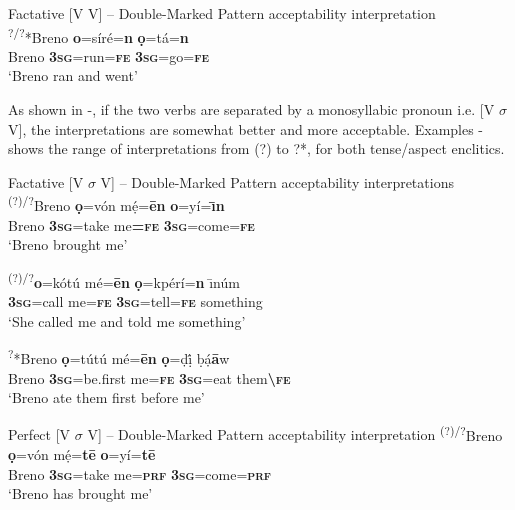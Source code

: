 \documentclass[output=paper]{langsci/langscibook}
\begin{document}
\ea\label{ex:rolle:23}
{Factative [V V] – Double-Marked Pattern acceptability interpretation}\\
\gll  \textsuperscript{?/?}*Breno   \textbf{o}=síré=\textbf{n}     \textbf{ọ}=tá=\textbf{n}\\
     Breno  \textbf{\textsc{3sg}}=run=\textbf{\textsc{fe}}    \textbf{\textsc{3sg}}=go=\textbf{\textsc{fe}}\\
\glt ‘Breno ran and went’
\z

As shown in -, if the two verbs are separated by a monosyllabic pronoun i.e. [V $\sigma $ V], the interpretations are somewhat better and more acceptable. Examples - shows the range of interpretations from (?) to ?*, for both tense/aspect enclitics.



\ea\label{ex:rolle:24}
{Factative [V $\sigma $ V] – Double-Marked Pattern acceptability interpretations} \\
  \ea 
\gll   \textsuperscript{(?)/?}Breno  \textbf{ọ}=vón  m\'{ẹ}=\textbf{\=en}  \textbf{o}=yí=\textbf{\={\i}n}\\
         Breno  \textbf{\textsc{3}\textsc{sg}}=take  me\textbf{=}\textbf{\textsc{fe}} \textbf{\textsc{3sg}}=come=\textbf{\textsc{fe}}\\
\glt ‘Breno brought me’

\ex\label{ex:rolle:25}
\gll   \textsuperscript{(?)/?}\textbf{o}=kótú    mé=\textbf{\=en}   \textbf{ọ}=kpérí=\textbf{n}   \={\i}núm\\
         \textbf{\textsc{3sg}}=call    me=\textbf{\textsc{fe}} \textbf{\textsc{3sg}}=tell=\textbf{\textsc{fe}}  something\\
\glt ‘She called me and told me something’

\ex\label{ex:rolle:26}
\gll   \textsuperscript{?}*Breno   \textbf{ọ}=tútú     mé=\textbf{ēn}  \textbf{ọ}=ḍị́   ḅạ́\textbf{ā}w\\
         Breno  \textbf{\textsc{3sg}}=be.first  me=\textbf{\textsc{fe}}   \textbf{\textsc{3sg}}=eat  them\textbf{{\textbackslash}}\textbf{\textsc{fe}}\\
\glt ‘Breno ate them first before me’
\z
\z 

\ea\label{ex:rolle:27}
{Perfect [V $\sigma $ V] – Double-Marked Pattern acceptability interpretation}
\gll  \textsuperscript{(?)/?}Breno   \textbf{ọ}=vón     mẹ́=\textbf{t\=e}     \textbf{o}=yí=\textbf{t\=e}\\
       Breno   \textbf{\textsc{3sg}}=take   me=\textbf{\textsc{prf}} \textbf{\textsc{3sg}}=come=\textbf{\textsc{prf}}\\
\glt ‘Breno has brought me’ 
\z
\end{document}
